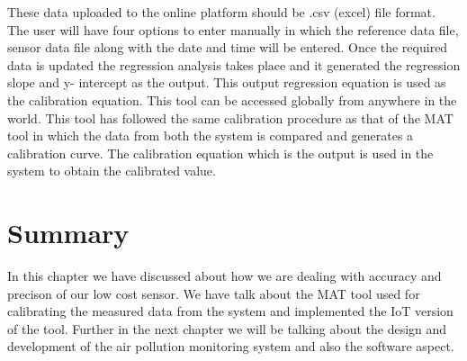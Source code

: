 These data uploaded to the online platform should be .csv (excel) file format. The user will have four options to enter manually in which the reference data file, sensor data file along with the date and time will be entered. Once the required data is updated the regression analysis takes place and it generated the regression slope and y- intercept as the output. This output regression equation is used as the calibration equation. This tool can be accessed globally from anywhere in the world. This tool has followed the same calibration procedure as that of the MAT tool in which the data from both the system is compared and generates a calibration curve. The calibration equation which is the output is used in the system to obtain the calibrated value.

\section{Summary}

In this chapter we have discussed about how we are dealing with accuracy and precison of our low cost sensor. We have talk about the MAT tool used for calibrating the measured data from the system and implemented the IoT version of the tool. Further in the next chapter we will be talking about the design and development of the air pollution monitoring system and also the software aspect.


